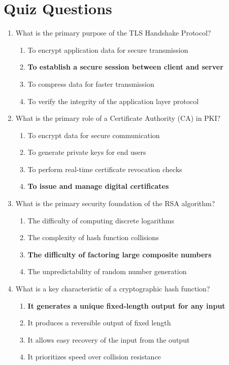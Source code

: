 \newpage

\section{Quiz Questions}

\begin{enumerate}
    \item What is the primary purpose of the TLS Handshake Protocol?
    \begin{enumerate}
        \item To encrypt application data for secure transmission
        \item \textbf{To establish a secure session between client and server}
        \item To compress data for faster transmission
        \item To verify the integrity of the application layer protocol
    \end{enumerate}

    \item What is the primary role of a Certificate Authority (CA) in PKI?
    \begin{enumerate}
        \item To encrypt data for secure communication
        \item To generate private keys for end users
        \item To perform real-time certificate revocation checks
        \item \textbf{To issue and manage digital certificates}
    \end{enumerate}

    \item What is the primary security foundation of the RSA algorithm?
    \begin{enumerate}
        \item The difficulty of computing discrete logarithms
        \item The complexity of hash function collisions
        \item \textbf{The difficulty of factoring large composite numbers}
        \item The unpredictability of random number generation
    \end{enumerate}

    \item What is a key characteristic of a cryptographic hash function?
    \begin{enumerate}
        \item \textbf{It generates a unique fixed-length output for any input}
        \item It produces a reversible output of fixed length
        \item It allows easy recovery of the input from the output
        \item It prioritizes speed over collision resistance
    \end{enumerate}


\end{enumerate}
